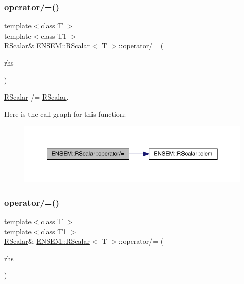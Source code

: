 \subsubsection{\texorpdfstring{operator/=()}{operator/=()}\hspace{0.1cm}{\footnotesize\ttfamily [1/3]}}
{\footnotesize\ttfamily template$<$class T $>$ \\
template$<$class T1 $>$ \\
\mbox{\hyperlink{classENSEM_1_1RScalar}{R\+Scalar}}\& \mbox{\hyperlink{classENSEM_1_1RScalar}{E\+N\+S\+E\+M\+::\+R\+Scalar}}$<$ T $>$\+::operator/= (\begin{DoxyParamCaption}\item[{const \mbox{\hyperlink{classENSEM_1_1RScalar}{R\+Scalar}}$<$ T1 $>$ \&}]{rhs }\end{DoxyParamCaption})\hspace{0.3cm}{\ttfamily [inline]}}



\mbox{\hyperlink{classENSEM_1_1RScalar}{R\+Scalar}} /= \mbox{\hyperlink{classENSEM_1_1RScalar}{R\+Scalar}}. 

Here is the call graph for this function\+:
\nopagebreak
\begin{figure}[H]
\begin{center}
\leavevmode
\includegraphics[width=350pt]{d0/d8c/classENSEM_1_1RScalar_a8d8cc49d7fed142b93c987c653465000_cgraph}
\end{center}
\end{figure}
\mbox{\label{classENSEM_1_1RScalar_a8d8cc49d7fed142b93c987c653465000}} 
\subsubsection{\texorpdfstring{operator/=()}{operator/=()}\hspace{0.1cm}{\footnotesize\ttfamily [2/3]}}
{\footnotesize\ttfamily template$<$class T $>$ \\
template$<$class T1 $>$ \\
\mbox{\hyperlink{classENSEM_1_1RScalar}{R\+Scalar}}\& \mbox{\hyperlink{classENSEM_1_1RScalar}{E\+N\+S\+E\+M\+::\+R\+Scalar}}$<$ T $>$\+::operator/= (\begin{DoxyParamCaption}\item[{const \mbox{\hyperlink{classENSEM_1_1RScalar}{R\+Scalar}}$<$ T1 $>$ \&}]{rhs }\end{DoxyParamCaption})\hspace{0.3cm}{\ttfamily [inline]}}



